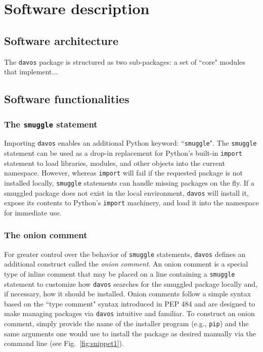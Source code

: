 \documentclass[preprint,12pt, a4paper]{elsarticle}
\newcommand{\comment}[1]{}
\begin{document}
\section{Software description}


\subsection{Software architecture}
The \texttt{davos} package is structured as two sub-packages: a set of ``core" modules that implement...



\subsection{Software functionalities}%

\subsubsection{The \texttt{smuggle} statement}
Importing \texttt{davos}\comment{in a Jupyter notebook} enables an additional Python keyword: ``\texttt{smuggle}".
The \texttt{smuggle} statement can be used as a drop-in replacement for Python's built-in \texttt{import} statement to load libraries, modules, and other objects into the current namespace.
However, whereas \texttt{import} will fail if the requested package is not installed locally, \texttt{smuggle} statements can handle missing packages on the fly.
If a smuggled package does not exist in the local environment, \texttt{davos} will install it, expose its contents to Python's \texttt{import} machinery, and load it into the namespace for immediate use.


\subsubsection{The onion comment}
For greater control over the behavior of \texttt{smuggle} statements, \texttt{davos} defines an additional construct called the \textit{onion comment}. An onion comment is a special type of inline comment that may be placed on a line containing a \texttt{smuggle} statement to customize how \texttt{davos} searches for the smuggled package locally and, if necessary, how it should be installed. Onion comments follow a simple syntax based on the ``type comment" syntax introduced in PEP 484 \cite{vanREtal14} and are designed to make managing packages via \texttt{davos} intuitive and familiar. To construct an onion comment, simply provide the name of the installer program (e.g., \texttt{pip}) and the same arguments one would use to install the package as desired manually via the command line (see Fig.~\ref{fig:snippet1}).
\end{document}
